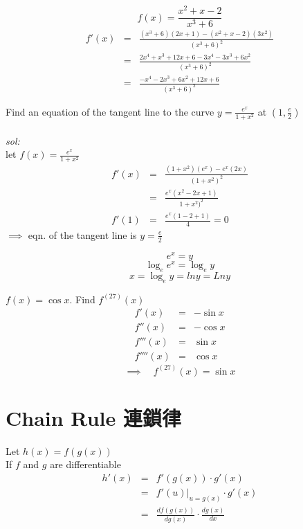 \begin{eg}
$$\displaystyle f(x) = \frac{x^2 + x-2}{x^3+6}$$
$$\begin{array}{rcl}
f'(x) & = & \displaystyle \frac{(x^3 + 6)(2x+1) - (x^2 + x-2)(3x^2)}{(x^3+6)^2}\\
& = & \displaystyle \frac{2x^4 + x^3 + 12x + 6 - 3x^4 - 3x^3 + 6x^2}{(x^3+6)^2}\\
& = & \displaystyle \frac{-x^4 -2x^3 + 6x^2+12x+6}{(x^3+6)^2}
\end{array}$$
\end{eg}
\begin{eg}
Find an equation of the tangent line to the curve $\displaystyle y = \frac{e^x}{1+x^2}$ at $\displaystyle (1, \frac{e}{2})$\\\\
\textit{sol:}\\
let $\displaystyle f(x) = \frac{e^x}{1+x^2}$
$$\begin{array}{rcl}
f'(x) & = & \displaystyle \frac{(1+x^2)(e^x) - e^x(2x)}{(1+x^2)^2}\\
& = & \displaystyle \frac{e^x(x^2 -2x+1)}{1+x^2)^2}\\
f'(1) & = & \displaystyle \frac{e^x(1-2+1)}{4} = 0
\end{array}$$
$\implies$ eqn. of the tangent line is $\displaystyle y = \frac{e}{2}$
\end{eg}

\begin{notn}
$$e^x = y$$
$$\log_e e^x = \log_e y$$
$$ x = \log_e y = ln y = Ln y$$
\end{notn}

\begin{eg}
$f(x) = \cos x$. \quad Find $f^{(27)}(x)$
$$\begin{array}{rcl}
f'(x) & = & -\sin x\\
f''(x) & = & -\cos x\\
f'''(x) & = & \sin x\\
f''''(x) & = & \cos x
\end{array}$$
$$\implies \quad f^{(27)}(x) = \sin x$$
\end{eg}
\section{Chain Rule 連鎖律}
\begin{defn}
Let $h(x) = f(g(x))$\\
If $f$ and $g$ are differentiable\\
$$\begin{array}{rcl}
h'(x) & = & f'(g(x)) \cdot g'(x)\\
& = & f'(u) |_{u=g(x)} \cdot g'(x)\\
& = & \displaystyle \frac{df(g(x))}{dg(x)} \cdot \frac{dg(x)}{dx}
\end{array}$$
\end{defn}

